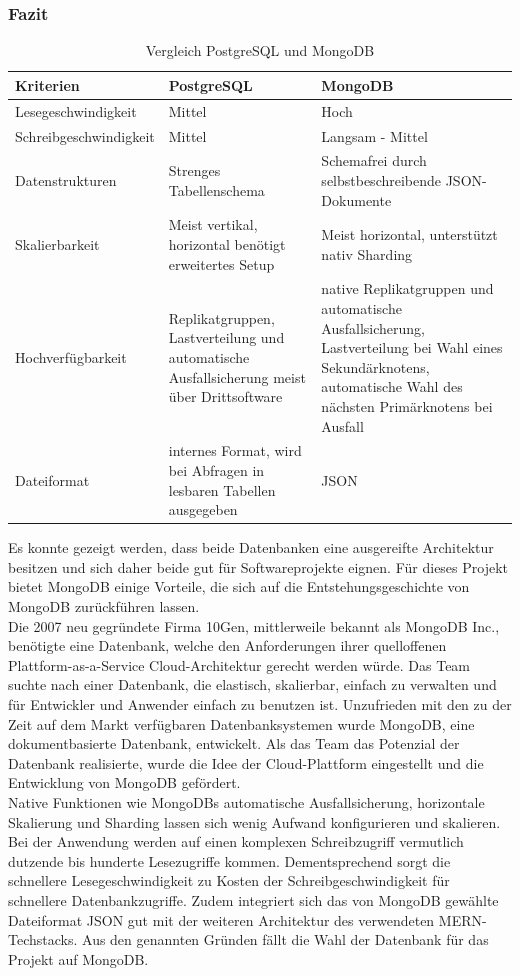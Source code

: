 \subsubsection{Fazit}
\begin{table}
\centering
\begin{tabularx}{\linewidth}{ |X|X|X| } 
    \hline
    Kriterien & PostgreSQL & MongoDB  \\ 
    \hline
    Lesegeschwindigkeit & Mittel & Hoch \\
    Schreibgeschwindigkeit & Mittel & Langsam - Mittel \\
    Datenstrukturen & Strenges Tabellenschema & Schemafrei durch selbstbeschreibende JSON-Dokumente \\
    Skalierbarkeit & Meist vertikal, horizontal benötigt erweitertes Setup & Meist horizontal, unterstützt nativ Sharding \\
    Hochverfügbarkeit & Replikatgruppen, Lastverteilung und automatische Ausfallsicherung meist über Drittsoftware & native Replikatgruppen und automatische Ausfallsicherung, Lastverteilung bei Wahl eines Sekundärknotens, automatische Wahl des nächsten Primärknotens bei Ausfall \\
    Dateiformat & internes Format, wird bei Abfragen in lesbaren Tabellen ausgegeben & JSON \\
    \hline
\end{tabularx}
\caption{Vergleich PostgreSQL und MongoDB}
\label{db:table:comparisonPostgresMongo}
\end{table}

Es konnte gezeigt werden, dass beide Datenbanken eine ausgereifte Architektur besitzen und sich daher beide gut für Softwareprojekte eignen.
Für dieses Projekt bietet MongoDB einige Vorteile, die sich auf die Entstehungsgeschichte von MongoDB zurückführen lassen.\\
Die 2007 neu gegründete Firma 10Gen, mittlerweile bekannt als MongoDB Inc., benötigte eine Datenbank, welche den Anforderungen ihrer quelloffenen Plattform-as-a-Service Cloud-Architektur gerecht werden würde.
Das Team suchte nach einer Datenbank, die elastisch, skalierbar, einfach zu verwalten und für Entwickler und Anwender einfach zu benutzen ist.
Unzufrieden mit den zu der Zeit auf dem Markt verfügbaren Datenbanksystemen wurde MongoDB, eine dokumentbasierte Datenbank, entwickelt.
Als das Team das Potenzial der Datenbank realisierte, wurde die Idee der Cloud-Plattform eingestellt und die Entwicklung von MongoDB gefördert.\cite{db:mongoHistory}\\
Native Funktionen wie MongoDBs automatische Ausfallsicherung, horizontale Skalierung und Sharding lassen sich wenig Aufwand konfigurieren und skalieren.
Bei der Anwendung werden auf einen komplexen Schreibzugriff vermutlich dutzende bis hunderte Lesezugriffe kommen.
Dementsprechend sorgt die schnellere Lesegeschwindigkeit zu Kosten der Schreibgeschwindigkeit für schnellere Datenbankzugriffe.
Zudem integriert sich das von MongoDB gewählte Dateiformat JSON gut mit der weiteren Architektur des verwendeten MERN-Techstacks.
Aus den genannten Gründen fällt die Wahl der Datenbank für das Projekt auf MongoDB.


